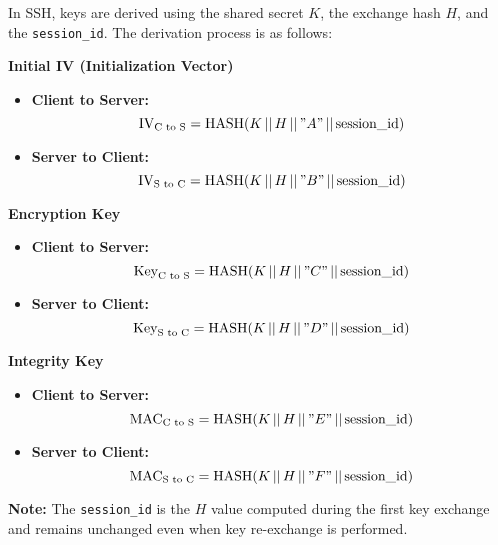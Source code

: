 In SSH, keys are derived using the shared secret \( K \), the exchange hash \( H \), and the \texttt{session\_id}. The derivation process is as follows:

\textbf{Initial IV (Initialization Vector)}
\begin{itemize}[itemsep=0pt]
    \item \textbf{Client to Server:} 
    \[
    \text{IV}_{\text{C to S}} = \text{HASH}( K \,||\, H \,||\, "A" \,||\, \text{session\_id} )
    \]
    \item \textbf{Server to Client:}
    \[
    \text{IV}_{\text{S to C}} = \text{HASH}( K \,||\, H \,||\, "B" \,||\, \text{session\_id} )
    \]
\end{itemize}

\textbf{Encryption Key}
\begin{itemize}[itemsep=0pt]
    \item \textbf{Client to Server:}
    \[
    \text{Key}_{\text{C to S}} = \text{HASH}( K \,||\, H \,||\, "C" \,||\, \text{session\_id} )
    \]
    \item \textbf{Server to Client:}
    \[
    \text{Key}_{\text{S to C}} = \text{HASH}( K \,||\, H \,||\, "D" \,||\, \text{session\_id} )
    \]
\end{itemize}

\textbf{Integrity Key}
\begin{itemize}[itemsep=0pt]
    \item \textbf{Client to Server:}
    \[
    \text{MAC}_{\text{C to S}} = \text{HASH}( K \,||\, H \,||\, "E" \,||\, \text{session\_id} )
    \]
    \item \textbf{Server to Client:}
    \[
    \text{MAC}_{\text{S to C}} = \text{HASH}( K \,||\, H \,||\, "F" \,||\, \text{session\_id} )
    \]
\end{itemize}

\textbf{Note:} The \texttt{session\_id} is the \( H \) value computed during the first key exchange and remains unchanged even when key re-exchange is performed.

